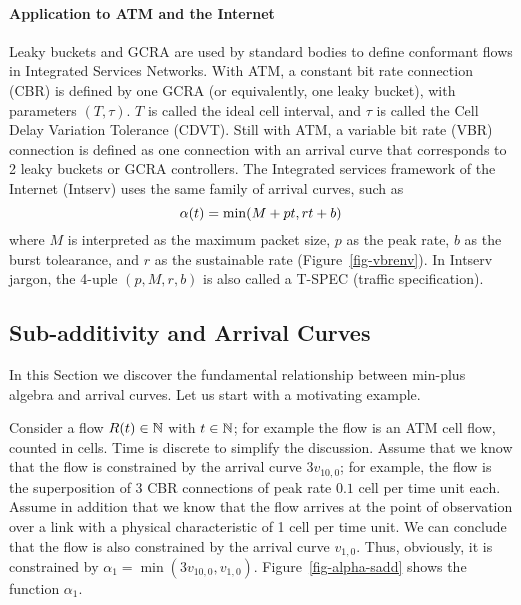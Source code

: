 \paragraph{Application to ATM and the Internet}

Leaky buckets and GCRA are used by standard bodies to define
conformant flows in Integrated Services Networks. With ATM, a
constant bit rate connection (CBR) is defined by one GCRA (or
equivalently, one leaky bucket), with parameters $(T, \tau)$. $T$
is called the ideal cell interval, and $\tau$ is called the Cell
Delay Variation Tolerance (CDVT). Still with ATM, a variable bit rate (VBR) connection
is defined as one connection with an arrival curve that
corresponds to 2 leaky buckets or GCRA controllers. The Integrated
services framework of the Internet (Intserv) uses the same family
of arrival curves, such as
\begin{equation}\mylabel{eq-tspec}
 \alpha(t) = \min(M+pt, rt+b)
\end{equation}
where $M$ is interpreted as the maximum packet size, $p$ as the
peak rate, $b$ as the burst tolearance, and $r$ as the sustainable
rate (Figure~\ref{fig-vbrenv}). In Intserv jargon, the 4-uple
$(p,M,r,b)$ is also called a T-SPEC (traffic specification).
\begin{figure}[!htbp]
    \protect{}
 \end{figure}

\subsection{Sub-additivity and Arrival Curves}

In this Section we discover the fundamental relationship between
min-plus algebra and arrival curves. Let us start with a
motivating example.

Consider a flow $R(t) \in \mathbb{N}$ with $t\in \mathbb{N}$; for example
the flow is an ATM cell flow, counted in cells. Time is discrete
to simplify the discussion. Assume that we know that the flow is
constrained by the arrival curve $3v_{10,0}$; for example, the
flow is the superposition of 3 CBR connections of peak rate $0.1$
cell per time unit each. Assume in addition that we know that the
flow arrives at the point of observation over a link with a
physical characteristic of 1 cell per time unit. We can conclude
that the flow is also constrained by the arrival curve $v_{1,0}$.
Thus, obviously, it is constrained by $\alpha_{1}=\min(3v_{10,0},
v_{1,0})$. Figure~\ref{fig-alpha-sadd} shows the function
$\alpha_{1}$.



